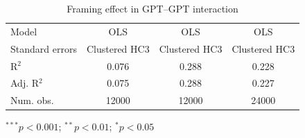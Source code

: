 \begin{table}[H]
\begin{center}
\begin{threeparttable}
\begin{tabular}{l S[table-format=5.6] S[table-format=5.6] S[table-format=5.6]}
Model                      & {OLS}                    & {OLS}                    & {OLS}                    \\
Standard errors            & {{\small Clustered HC3}} & {{\small Clustered HC3}} & {{\small Clustered HC3}} \\
R$^2$                      & 0.076                    & 0.288                    & 0.228                    \\
Adj. R$^2$                 & 0.075                    & 0.288                    & 0.227                    \\
Num. obs.                  &{12000}                   &{12000}                   &{24000}                   \\
\bottomrule
\end{tabular}
\begin{tablenotes}[flushleft]
\scriptsize{\item $^{***}p<0.001$; $^{**}p<0.01$; $^{*}p<0.05$}
\end{tablenotes}
\end{threeparttable}
\caption{Framing effect in GPT--GPT interaction}
\label{rt1_models}
\end{center}
\end{table}

